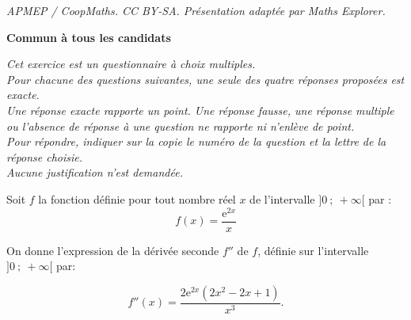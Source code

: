\documentclass[10pt]{article}
\providecommand{\e}{{\mathrm{e}}}
\begin{document}
\noindent\textit{APMEP / CoopMaths. CC BY-SA. Présentation adaptée par Maths Explorer.}\par\medskip
\textbf{Commun à tous les candidats}

\medskip


\emph{Cet exercice est un questionnaire à choix multiples.\\
 Pour chacune des questions suivantes, une seule des quatre réponses proposées est exacte.\\
 Une réponse exacte rapporte un point. Une réponse fausse, une réponse multiple ou l'absence de réponse à une question ne rapporte ni
n'enlève de point.\\
 Pour répondre, indiquer sur la copie le numéro de la question et la lettre de
la réponse choisie.\\ Aucune justification n'est demandée.}

\vspace{0.7cm}

Soit $f$ la fonction définie pour tout nombre réel $x$ de l'intervalle $]0~;~ +\infty[$ par :
\[ f(x) =\dfrac{\e^{2x}}{x}\]

On donne l'expression de la dérivée seconde $f''$ de $f$, définie sur l'intervalle $]0~;~ +\infty[$ par:

\[f''(x)=\dfrac {2 \e^{2x} (2x^2-2x+1)}{x^3}.\]
\end{document}
